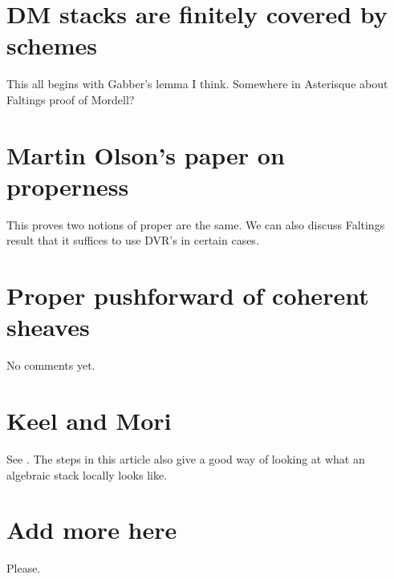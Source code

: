 \section{DM stacks are finitely covered by schemes}
\label{section-dm-finite-cover}

\noindent
This all begins with Gabber's lemma I think. Somewhere in Asterisque about
Faltings proof of Mordell?

\section{Martin Olson's paper on properness}
\label{section-proper-parametrization}

\noindent
This proves two notions of proper are the same. We can also discuss Faltings
result that it suffices to use DVR's in certain cases.

\section{Proper pushforward of coherent sheaves}
\label{section-proper-pushforward}

\noindent
No comments yet.

\section{Keel and Mori}
\label{section-keel-mori}

\noindent
See \cite{K-M}. The steps in this article also give a good way of looking at
what an algebraic stack locally looks like.

\section{Add more here}
\label{section-add-more}

\noindent
Please.









